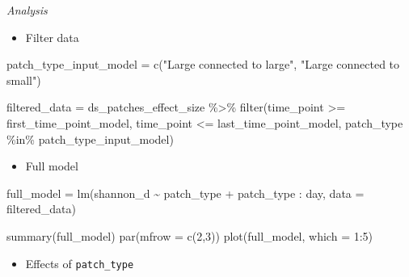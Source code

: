\documentclass[
]{article}
\newenvironment{Shaded}{\begin{snugshade}}{\end{snugshade}}
\newcommand{\AttributeTok}[1]{\textcolor[rgb]{0.77,0.63,0.00}{#1}}
\newcommand{\DecValTok}[1]{\textcolor[rgb]{0.00,0.00,0.81}{#1}}
\newcommand{\FunctionTok}[1]{\textcolor[rgb]{0.00,0.00,0.00}{#1}}
\newcommand{\NormalTok}[1]{#1}
\newcommand{\OtherTok}[1]{\textcolor[rgb]{0.56,0.35,0.01}{#1}}
\newcommand{\SpecialCharTok}[1]{\textcolor[rgb]{0.00,0.00,0.00}{#1}}
\newcommand{\StringTok}[1]{\textcolor[rgb]{0.31,0.60,0.02}{#1}}
\providecommand{\tightlist}{%
  \setlength{\itemsep}{0pt}\setlength{\parskip}{0pt}}
\begin{document}
\emph{Analysis}

\begin{itemize}
\tightlist
\item
  Filter data
\end{itemize}

\begin{Shaded}
\begin{Highlighting}[]
\NormalTok{patch\_type\_input\_model }\OtherTok{=} \FunctionTok{c}\NormalTok{(}\StringTok{"Large connected to large"}\NormalTok{,}
                                 \StringTok{"Large connected to small"}\NormalTok{)}

\NormalTok{filtered\_data }\OtherTok{=}\NormalTok{ ds\_patches\_effect\_size }\SpecialCharTok{\%\textgreater{}\%}
                         \FunctionTok{filter}\NormalTok{(time\_point }\SpecialCharTok{\textgreater{}=}\NormalTok{ first\_time\_point\_model,}
\NormalTok{                                time\_point }\SpecialCharTok{\textless{}=}\NormalTok{ last\_time\_point\_model,}
\NormalTok{                                patch\_type }\SpecialCharTok{\%in\%}\NormalTok{ patch\_type\_input\_model)}
\end{Highlighting}
\end{Shaded}

\begin{itemize}
\tightlist
\item
  Full model
\end{itemize}

\begin{Shaded}
\begin{Highlighting}[]
\NormalTok{full\_model }\OtherTok{=} \FunctionTok{lm}\NormalTok{(shannon\_d }\SpecialCharTok{\textasciitilde{}}                  
\NormalTok{                  patch\_type }\SpecialCharTok{+}
\NormalTok{                  patch\_type }\SpecialCharTok{:}\NormalTok{ day,}
                  \AttributeTok{data =}\NormalTok{ filtered\_data)}

\FunctionTok{summary}\NormalTok{(full\_model)}
\FunctionTok{par}\NormalTok{(}\AttributeTok{mfrow =} \FunctionTok{c}\NormalTok{(}\DecValTok{2}\NormalTok{,}\DecValTok{3}\NormalTok{))}
\FunctionTok{plot}\NormalTok{(full\_model, }\AttributeTok{which =} \DecValTok{1}\SpecialCharTok{:}\DecValTok{5}\NormalTok{)}
\end{Highlighting}
\end{Shaded}

\begin{itemize}
\tightlist
\item
  Effects of \texttt{patch\_type}
\end{itemize}
\end{document}
